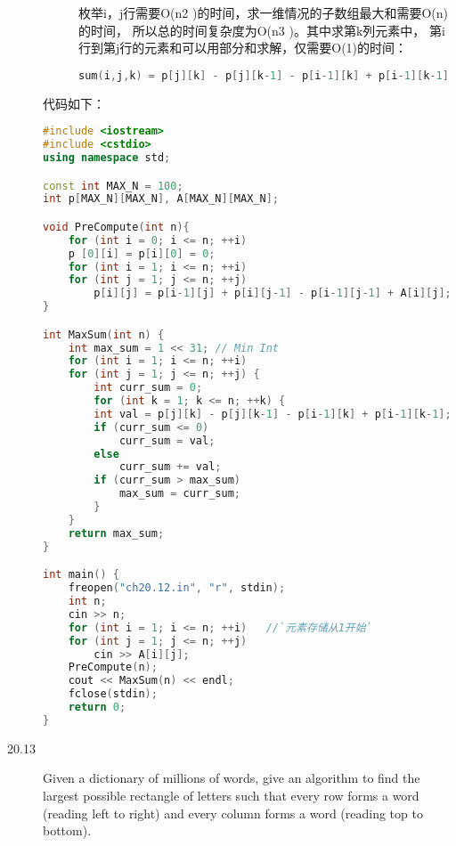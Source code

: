 \begin{description}
\begin{description}
枚举i，j行需要O(n2 )的时间，求一维情况的子数组最大和需要O(n)的时间， 所以总的时间复杂度为O(n3 )。其中求第k列元素中， 第i行到第j行的元素和可以用部分和求解，仅需要O(1)的时间：
\begin{lstlisting}[language=C++]
sum(i,j,k) = p[j][k] - p[j][k-1] - p[i-1][k] + p[i-1][k-1]
\end{lstlisting}
\end{description}
代码如下：
\begin{lstlisting}[language=C++]
#include <iostream>
#include <cstdio>
using namespace std;

const int MAX_N = 100;
int p[MAX_N][MAX_N], A[MAX_N][MAX_N];

void PreCompute(int n){
    for (int i = 0; i <= n; ++i)
	p [0][i] = p[i][0] = 0;
    for (int i = 1; i <= n; ++i)
	for (int j = 1; j <= n; ++j)
	    p[i][j] = p[i-1][j] + p[i][j-1] - p[i-1][j-1] + A[i][j];
}

int MaxSum(int n) {
    int max_sum = 1 << 31; // Min Int
    for (int i = 1; i <= n; ++i) 
	for (int j = 1; j <= n; ++j) {
	    int curr_sum = 0;
	    for (int k = 1; k <= n; ++k) {
		int val = p[j][k] - p[j][k-1] - p[i-1][k] + p[i-1][k-1];
		if (curr_sum <= 0) 
		    curr_sum = val;
		else
		    curr_sum += val;
		if (curr_sum > max_sum)
		    max_sum = curr_sum;
	    }
	}
    return max_sum;
}

int main() {
    freopen("ch20.12.in", "r", stdin);
    int n;
    cin >> n;
    for (int i = 1; i <= n; ++i)   //`元素存储从1开始`
	for (int j = 1; j <= n; ++j)
	    cin >> A[i][j];
    PreCompute(n);
    cout << MaxSum(n) << endl;
    fclose(stdin);
    return 0;
}
\end{lstlisting}
%


\item[20.13] Given a dictionary of millions of words, give an algorithm to find the largest possible rectangle of letters such that every row forms a word (reading left to right) and every column forms a word (reading top to bottom).

\end{description}
